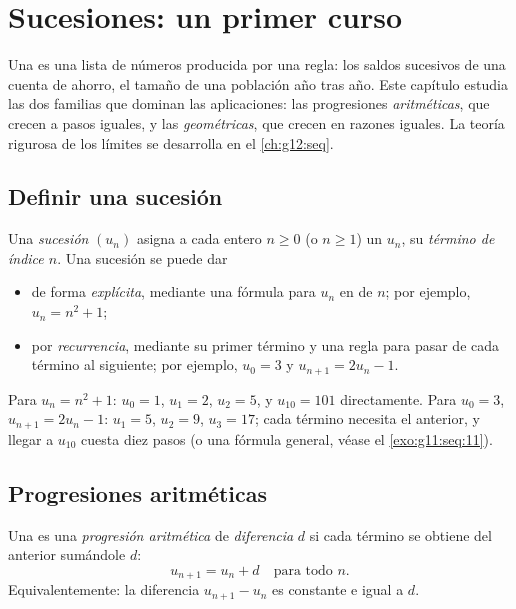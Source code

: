 \chapter{Sucesiones: un primer curso}\label{ch:g11:seq}

Una  es una lista de números producida por una regla: los saldos
sucesivos de una cuenta de ahorro, el tamaño de una población año tras
año. Este capítulo estudia las dos familias que dominan las aplicaciones:
las progresiones \emph{aritméticas}, que crecen a pasos iguales, y las
\emph{geométricas}, que crecen en razones iguales. La teoría rigurosa de
los límites se desarrolla en el \cref{ch:g12:seq}.

\section{Definir una sucesión}

\begin{definition}[Sucesión]\label{def:g11:seq:sequence}
Una \emph{sucesión} $(u_n)$ asigna a cada entero
$n \geq 0$ (o $n \geq 1$) un  $u_n$, su \emph{término de índice
$n$}. Una sucesión se puede dar
\begin{itemize}
  \item de forma \emph{explícita}, mediante una fórmula para $u_n$ en
         de $n$; por ejemplo, $u_n = n^2 + 1$;
  \item por \emph{recurrencia}, mediante su primer término y una regla
        para pasar de cada término al siguiente; por ejemplo, $u_0 = 3$ y
        $u_{n+1} = 2u_n - 1$.
\end{itemize}
\end{definition}

\begin{example}
Para $u_n = n^2 + 1$: $u_0 = 1$, $u_1 = 2$, $u_2 = 5$, y $u_{10} = 101$
directamente. Para $u_0 = 3$, $u_{n+1} = 2u_n - 1$: $u_1 = 5$, $u_2 = 9$,
$u_3 = 17$; cada término necesita el anterior, y llegar a $u_{10}$ cuesta
diez pasos (o una fórmula general, véase el \cref{exo:g11:seq:11}).
\end{example}

\section{Progresiones aritméticas}

\begin{definition}\label{def:g11:seq:arithmetic}
Una  es una \emph{progresión aritmética} de \emph{diferencia} $d$ si cada término se
obtiene del anterior sumándole $d$:
\[
u_{n+1} = u_n + d \quad \text{para todo } n.
\]
Equivalentemente: la diferencia $u_{n+1} - u_n$ es constante e igual a
$d$.
\end{definition}


